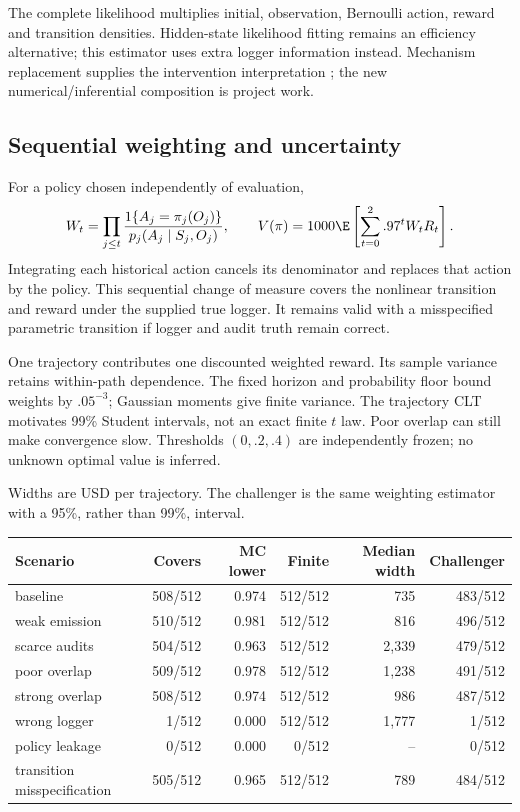 The complete likelihood multiplies initial, observation, Bernoulli action, reward and transition densities. Hidden-state likelihood fitting remains an efficiency alternative; this estimator uses extra logger information instead. Mechanism replacement supplies the intervention interpretation \cite{pearl2009}; the new numerical/inferential composition is project work.

\subsection{Sequential weighting and uncertainty}
For a policy chosen independently of evaluation,
\[
 W_t=\prod_{j\le t}\frac{1\{A_j=\pi_j(O_j)\}}{p_j(A_j\mid S_j,O_j)},\qquad
 V(\pi)=1000\E\left[\sum_{t=0}^2.97^t W_tR_t\right].
\]
Integrating each historical action cancels its denominator and replaces that action by the policy. This sequential change of measure covers the nonlinear transition and reward under the supplied true logger. It remains valid with a misspecified parametric transition if logger and audit truth remain correct.

One trajectory contributes one discounted weighted reward. Its sample variance retains within-path dependence. The fixed horizon and probability floor bound weights by $.05^{-3}$; Gaussian moments give finite variance. The trajectory CLT motivates 99\% Student intervals, not an exact finite $t$ law. Poor overlap can still make convergence slow. Thresholds $(0,.2,.4)$ are independently frozen; no unknown optimal value is inferred.

Widths are USD per trajectory. The challenger is the same weighting estimator with a 95\%, rather than 99\%, interval.

\begin{center}\footnotesize\begin{tabular}{lrrrrr}\toprule
Scenario & Covers & MC lower & Finite & Median width & Challenger\\
\midrule
baseline & 508/512 & 0.974 & 512/512 & 735 & 483/512 \\
weak emission & 510/512 & 0.981 & 512/512 & 816 & 496/512 \\
scarce audits & 504/512 & 0.963 & 512/512 & 2,339 & 479/512 \\
poor overlap & 509/512 & 0.978 & 512/512 & 1,238 & 491/512 \\
strong overlap & 508/512 & 0.974 & 512/512 & 986 & 487/512 \\
wrong logger & 1/512 & 0.000 & 512/512 & 1,777 & 1/512 \\
policy leakage & 0/512 & 0.000 & 0/512 & -- & 0/512 \\
transition misspecification & 505/512 & 0.965 & 512/512 & 789 & 484/512 \\
\bottomrule\end{tabular}\end{center}


